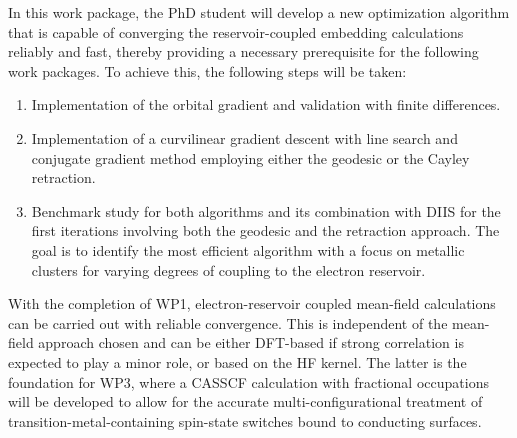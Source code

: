 \documentclass[a4paper,11pt,headings=normal]{scrartcl}
\begin{document}
\begin{itemize}
In this work package, the PhD student will develop a new optimization algorithm that is capable of converging the reservoir-coupled embedding calculations reliably and fast, thereby providing a necessary prerequisite for the following work packages. To achieve this, the following steps will be taken:
\begin{enumerate}[itemsep=0pt, topsep=0pt]
\item Implementation of the orbital gradient and validation with finite differences.
\item Implementation of a curvilinear gradient descent with line search and conjugate gradient method employing either the geodesic or the Cayley retraction.\autocite{zhu2017}
\item Benchmark study for both algorithms and its combination with DIIS for the first iterations involving both the geodesic and the retraction approach. The goal is to identify the most efficient algorithm with a focus on metallic clusters for varying degrees of coupling to the electron reservoir.
\end{enumerate}
With the completion of WP1, electron-reservoir coupled mean-field calculations 
can be carried out with reliable convergence. This is independent of the 
mean-field approach chosen and can be either DFT-based if strong correlation is 
expected to play a minor role, or based on the HF kernel. 
The latter is the foundation for WP3, where a CASSCF calculation with fractional occupations will be developed to allow for the accurate multi-configurational treatment of transition-metal-containing spin-state switches bound to conducting surfaces.\\



\end{itemize}
\end{document}
